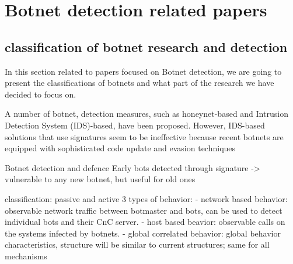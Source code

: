 \section{Botnet detection related papers}
\subsection{classification of botnet research and detection}
In this section related to papers focused on Botnet detection, we are going to present the classifications of botnets and what part of the research we have decided to focus on.

A number of botnet, detection measures, such as honeynet-based and Intrusion Detection System (IDS)-based, have been
proposed. However, IDS-based solutions that use signatures seem to be ineffective because recent
botnets are equipped with sophisticated code update and evasion techniques

Botnet detection and defence
Early bots detected through signature 
-> vulnerable to any new botnet, but useful for old ones

classification: passive and active
3 types of behavior: 
- network based behavior: observable network traffic between botmaster and bots, can be used to detect individual bots and their CnC server. 
- host based beavior: observable calls on the systems infected by botnets. 
- global correlated behavior: global behavior characteristics, structure will be similar to current structures; same for all mechanisms

